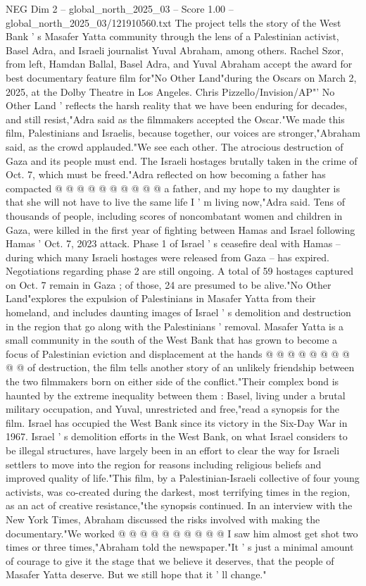 \begin{textsample}{NEG Dim 2 – global\_north\_2025\_03 – Score 1.00 – global\_north\_2025\_03/121910560.txt}  \label{ex:f2_neg_045}
The project tells the story of the West Bank ' s Masafer Yatta community through the lens of a Palestinian activist, Basel Adra, and Israeli journalist Yuval Abraham, among others.
Rachel Szor, from left, Hamdan Ballal, Basel Adra, and Yuval Abraham accept the award for best documentary feature film for"No Other Land"during the Oscars on March 2, 2025, at the Dolby Theatre in Los Angeles.
Chris Pizzello/Invision/AP"' No Other Land ' reflects the harsh reality that we have been enduring for decades, and still resist,"Adra said as the filmmakers accepted the Oscar."We made this film, Palestinians and Israelis, because together, our voices are stronger,"Abraham said, as the crowd applauded."We see each other.
The atrocious destruction of Gaza and its people must end.
The Israeli hostages brutally taken in the crime of Oct. 7, which must be freed."Adra reflected on how becoming a father has compacted @ @ @ @ @ @ @ @ @ @ a father, and my hope to my daughter is that she will not have to live the same life I ' m living now,"Adra said.
Tens of thousands of people, including scores of noncombatant women and children in Gaza, were killed in the first year of fighting between Hamas and Israel following Hamas ' Oct. 7, 2023 attack.
Phase 1 of Israel ' s ceasefire deal with Hamas -- during which many Israeli hostages were released from Gaza -- has expired.
Negotiations regarding phase 2 are still ongoing.
A total of 59 hostages captured on Oct. 7 remain in Gaza ; of those, 24 are presumed to be alive."No Other Land"explores the expulsion of Palestinians in Masafer Yatta from their homeland, and includes daunting images of Israel ' s demolition and destruction in the region that go along with the Palestinians ' removal.
Masafer Yatta is a small community in the south of the West Bank that has grown to become a focus of Palestinian eviction and displacement at the hands @ @ @ @ @ @ @ @ @ @ of destruction, the film tells another story of an unlikely friendship between the two filmmakers born on either side of the conflict."Their complex bond is haunted by the extreme inequality between them : Basel, living under a brutal military occupation, and Yuval, unrestricted and free,"read a synopsis for the film.
Israel has occupied the West Bank since its victory in the Six-Day War in 1967.
Israel ' s demolition efforts in the West Bank, on what Israel considers to be illegal structures, have largely been in an effort to clear the way for Israeli settlers to move into the region for reasons including religious beliefs and improved quality of life."This film, by a Palestinian-Israeli collective of four young activists, was co-created during the darkest, most terrifying times in the region, as an act of creative resistance,"the synopsis continued.
In an interview with the New York Times, Abraham discussed the risks involved with making the documentary."We worked @ @ @ @ @ @ @ @ @ @ I saw him almost get shot two times or three times,"Abraham told the newspaper."It ' s just a minimal amount of courage to give it the stage that we believe it deserves, that the people of Masafer Yatta deserve.
But we still hope that it ' ll change."

\end{textsample}
